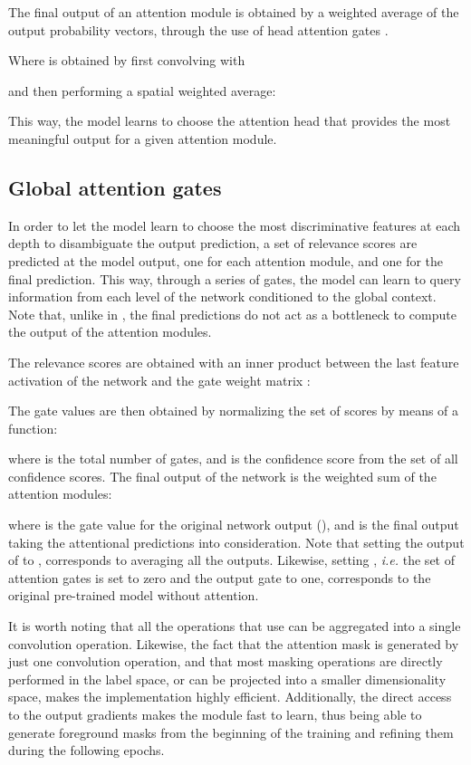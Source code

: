 \documentclass[runningheads]{llncs}
\begin{document}
The final output  of an attention module is obtained by a weighted average of the  output probability vectors, through the use of head attention gates .



Where  is obtained by first convolving  with



and then performing a spatial weighted average:



This way, the model learns to choose the attention head that provides the most meaningful output for a given attention module.

\subsection{Global attention gates}
In order to let the model learn to choose the most discriminative features at each depth to disambiguate the output prediction, a set of relevance scores   are predicted at the model output, one for each attention module, and one for the final prediction. This way, through a series of gates, the model can learn to query information from each level of the network conditioned to the global context. Note that, unlike in \cite{jetley2018learn}, the final predictions do not act as a bottleneck to compute the output of the attention modules.

The relevance scores are obtained with an inner product between the last feature activation of the network  and the gate weight matrix :



The gate values  are then obtained by normalizing the set of scores by means of a  function:



where  is the total number of gates, and  is the  confidence score from the set of all confidence scores. The final output of the network is the weighted sum of the attention modules: 



where  is the gate value for the original network output (), and  is the final output taking the attentional predictions  into consideration. Note that setting the output of  to , corresponds to averaging all the outputs. Likewise, setting , \emph{i.e.} the set of attention gates is set to zero and the output gate to one, corresponds to the original pre-trained model without attention.

It is worth noting that all the operations that use  can be aggregated into a single convolution operation. Likewise, the fact that the attention mask is generated by just one convolution operation, and that most masking operations are directly performed in the label space, or can be projected into a smaller dimensionality space, makes the implementation highly efficient. Additionally, the direct access to the output gradients makes the module fast to learn, thus being able to generate foreground masks from the beginning of the training and refining them during the following epochs. 
\end{document}
